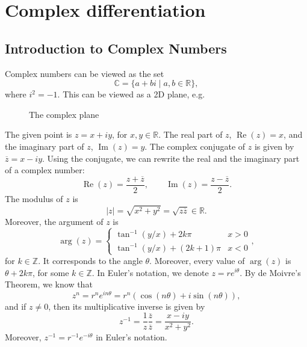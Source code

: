 \documentclass[a4paper, openany]{memoir}
\theoremstyle{definition}
\theoremstyle{plain}
\begin{document}
\chapter{Complex differentiation}
\setcounter{section}{-1}
\section{Introduction to Complex Numbers}
Complex numbers can be viewed as the set
\[\mathbb{C} = \{a + bi \mid a, b \in \mathbb{R}\},\]
where $i^2 = -1$. This can be viewed as a 2D plane, e.g.
\begin{figure}[H]
    \centering
    \caption{The complex plane}
\end{figure}
\noindent The given point is $z = x + iy$, for $x, y \in \mathbb{R}$. The real part of $z$, $\operatorname{Re}(z) = x$, and the imaginary part of $z$, $\operatorname{Im}(z) = y$. The complex conjugate of $z$ is given by $\overline{z} = x - iy$. Using the conjugate, we can rewrite the real and the imaginary part of a complex number:
\[\operatorname{Re}(z) = \frac{z + \overline{z}}{2}, \qquad \operatorname{Im}(z) = \frac{z - \overline{z}}{2}.\]
The modulus of $z$ is
\[|z| = \sqrt{x^2 + y^2} = \sqrt{z \overline{z}} \in \mathbb{R}.\]
Moreover, the argument of $z$ is
\[\operatorname{arg}(z) = \begin{cases}
\tan^{-1}(y/x) + 2k\pi & x > 0 \\
\tan^{-1}(y/x) + (2k+1)\pi & x < 0 
\end{cases},\]
for $k \in \mathbb{Z}$. It corresponds to the angle $\theta$. Moreover, every value of $\arg (z)$ is $\theta + 2k \pi$, for some $k \in \mathbb{Z}$. In Euler's notation, we denote $z = re^{i \theta}$. By de Moivre's Theorem, we know that
\[z^n = r^n e^{in \theta} = r^n (\cos (n \theta) + i \sin (n \theta)),\]
and if $z \neq 0$, then its multiplicative inverse is given by
\[z^{-1} = \frac{1}{z} \frac{\overline{z}}{\overline{z}} = \frac{x - iy}{x^2 + y^2}.\]
Moreover, $z^{-1} = r^{-1} e^{-i \theta}$ in Euler's notation.
\end{document}
